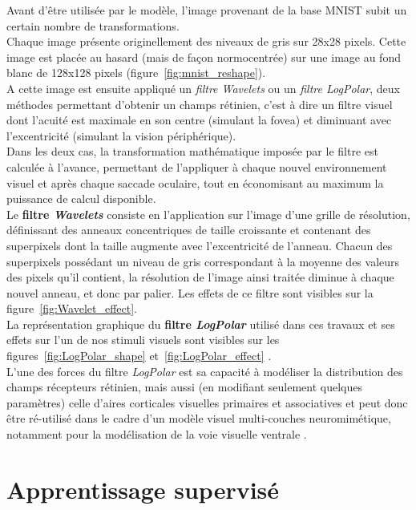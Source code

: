 Avant d'être utilisée par le modèle, l'image provenant de la base MNIST subit un certain nombre de transformations.\\
Chaque image présente originellement des niveaux de gris sur 28x28 pixels. Cette image est placée au hasard (mais de façon normocentrée) sur une image au fond blanc de 128x128 pixels (figure~\ref{fig:mnist_reshape}).\\
A cette image est ensuite appliqué un \textit{filtre Wavelets} ou un \textit{filtre LogPolar}, deux méthodes permettant d'obtenir un champs rétinien, c'est à dire un filtre visuel dont l'acuité est maximale en son centre (simulant la fovea) et diminuant avec l'excentricité (simulant la vision périphérique). \\
Dans les deux cas, la transformation mathématique imposée par le filtre est calculée à l'avance, permettant de l'appliquer à chaque nouvel environnement visuel et après chaque saccade oculaire, tout en économisant au maximum la puissance de calcul disponible.\autocite{Kortum1996}\\
Le \textbf{filtre \textit{Wavelets}} consiste en l'application sur l'image d'une grille de résolution, définissant des anneaux concentriques de taille croissante et contenant des superpixels dont la taille augmente avec l'excentricité de l'anneau. Chacun des superpixels possédant un niveau de gris correspondant à la moyenne des valeurs des pixels qu'il contient, la résolution de l'image ainsi traitée diminue à chaque nouvel anneau, et donc par palier.\autocite{Kortum1996}
Les effets de ce filtre sont visibles sur la figure~\ref{fig:Wavelet_effect}.\\
La représentation graphique du \textbf{filtre \textit{LogPolar}} utilisé dans ces travaux et ses effets sur l'un de nos stimuli visuels sont visibles sur les figures~\ref{fig:LogPolar_shape} et~\ref{fig:LogPolar_effect} .\\
L'une des forces du filtre \textit{LogPolar} est sa capacité à modéliser la distribution des champs récepteurs rétinien, mais aussi (en modifiant seulement quelques paramètres) celle d'aires corticales visuelles primaires et associatives et peut donc être ré-utilisé dans le cadre d'un modèle visuel multi-couches neuromimétique, notamment pour la modélisation de la voie visuelle ventrale \autocite{Freeman2011}.


\section{Apprentissage supervisé} %

